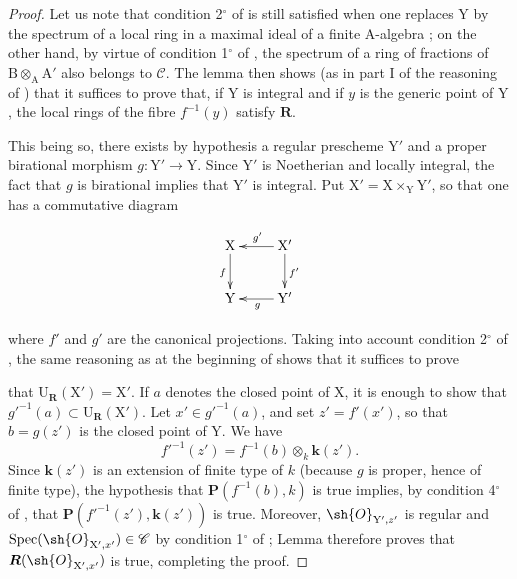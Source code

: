 \begin{proof}
Let us note that condition 2${}^\circ$ of  is still satisfied when one replaces $\mathrm{Y}$ by the spectrum of a local ring in a maximal ideal of a finite $\mathrm{A}$-algebra ; on the other hand, by virtue of condition 1${}^\circ$ of , the spectrum of a ring of fractions of $\mathrm{B}\otimes_\mathrm{A}\mathrm{A}'$ also belongs to $\mathcal{C}$. The lemma  then shows (as in part I of the reasoning of ) that it suffices to prove that, if $\mathrm{Y}$ is integral and if $y$ is the generic point of $\mathrm{Y}$, the local rings of the fibre $f^{-1}(y)$ satisfy $\boldsymbol{R}$.

This being so, there exists by hypothesis a regular prescheme $\mathrm{Y}'$ and a proper birational morphism $g:\mathrm{Y}'\to\mathrm{Y}$. Since $\mathrm{Y}'$ is Noetherian and locally integral, the fact that $g$ is birational implies that $\mathrm{Y}'$ is integral. Put $\mathrm{X}'=\mathrm{X}\times_\mathrm{Y}\mathrm{Y}'$, so that one has a commutative diagram

\begin{env}[7.9.8.1]
\label{IV.7.9.8.1}
\[
  \xymatrix{
    \mathrm{X} \ar[d]_f & \mathrm{X}' \ar[l]_{g'} \ar[d]^{f'} \\
    \mathrm{Y} & \mathrm{Y}' \ar[l]^g
  }
\]
\end{env}

where $f'$ and $g'$ are the canonical projections. Taking into account condition 2${}^\circ$ of , the same reasoning as at the beginning of  shows that it suffices to prove


that $\mathrm{U}_{\boldsymbol{R}}(\mathrm{X}')=\mathrm{X}'$. If $a$ denotes the closed point of $\mathrm{X}$, it is enough to show that $g'^{-1}(a)\subset\mathrm{U}_{\boldsymbol{R}}(\mathrm{X}')$. Let $x'\in g'^{-1}(a)$, and set $z'=f'(x')$, so that $b=g(z')$ is the closed point of $\mathrm{Y}$. We have
\[
  f'^{-1}(z')=f^{-1}(b)\otimes_k\boldsymbol{k}(z').
\]
Since $\boldsymbol{k}(z')$ is an extension of finite type of $k$ (because $g$ is proper, hence of finite type), the hypothesis that $\boldsymbol{P}(f^{-1}(b),k)$ is true implies, by condition 4${}^\circ$ of , that $\boldsymbol{P}(f'^{-1}(z'),\boldsymbol{k}(z'))$ is true. Moreover, $\sh{O}_{\mathrm{Y}',z'}$ is regular and $\operatorname{Spec}(\sh{O}_{\mathrm{X}',x'})\in\mathcal{C}$ by condition 1${}^\circ$ of ; Lemma  therefore proves that $\boldsymbol{R}(\sh{O}_{\mathrm{X}',x'})$ is true, completing the proof.
\end{proof}

